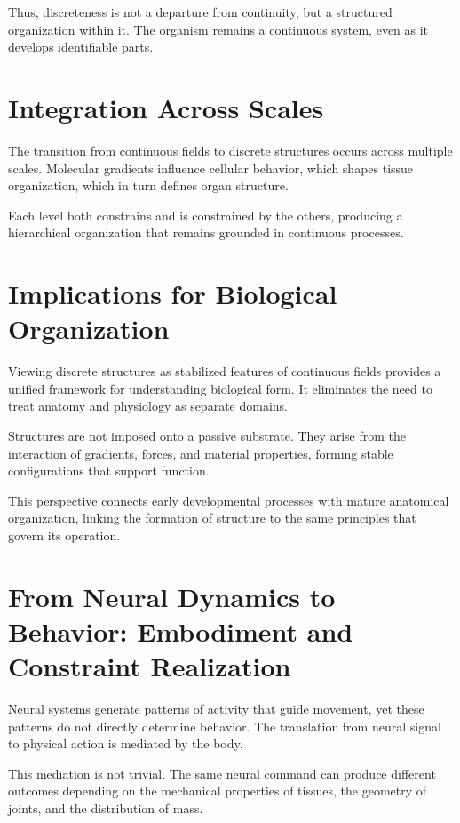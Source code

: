 \documentclass[11pt,oneside]{book}
\begin{document}
Thus, discreteness is not a departure from continuity, but a structured organization within it. The organism remains a continuous system, even as it develops identifiable parts.

\section{Integration Across Scales}

The transition from continuous fields to discrete structures occurs across multiple scales. Molecular gradients influence cellular behavior, which shapes tissue organization, which in turn defines organ structure.

Each level both constrains and is constrained by the others, producing a hierarchical organization that remains grounded in continuous processes.

\section{Implications for Biological Organization}

Viewing discrete structures as stabilized features of continuous fields provides a unified framework for understanding biological form. It eliminates the need to treat anatomy and physiology as separate domains.

Structures are not imposed onto a passive substrate. They arise from the interaction of gradients, forces, and material properties, forming stable configurations that support function.

This perspective connects early developmental processes with mature anatomical organization, linking the formation of structure to the same principles that govern its operation.

\section{From Neural Dynamics to Behavior: Embodiment and Constraint Realization}

Neural systems generate patterns of activity that guide movement, yet these patterns do not directly determine behavior. The translation from neural signal to physical action is mediated by the body.

This mediation is not trivial. The same neural command can produce different outcomes depending on the mechanical properties of tissues, the geometry of joints, and the distribution of mass.
\end{document}
